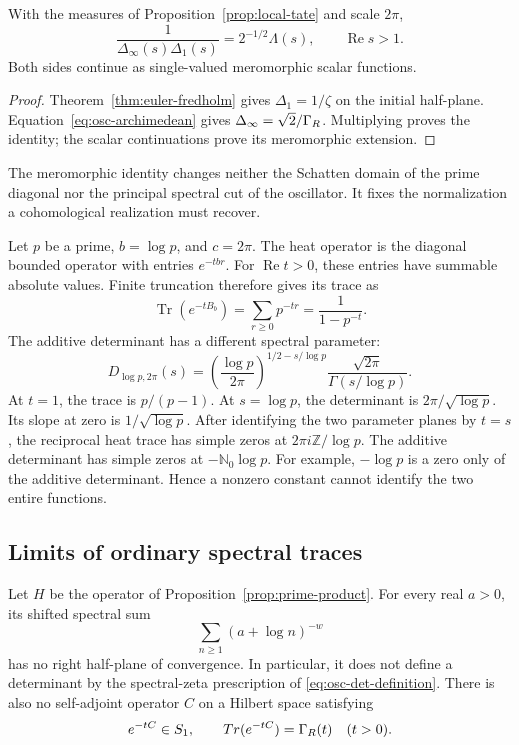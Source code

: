 \begin{corollary}
\label{cor:completed-euler}
With the measures of Proposition~\ref{prop:local-tate} and scale $2\pi$,
\[
 \frac1{\Delta_\infty(s)\Delta_1(s)}
 =2^{-1/2}\Lambda(s),\qquad \operatorname{Re}s>1.
\]
Both sides continue as single-valued meromorphic scalar functions.
\end{corollary}
\begin{proof}
Theorem~\ref{thm:euler-fredholm} gives $\Delta_1=1/\zeta$ on the
initial half-plane. Equation~\eqref{eq:osc-archimedean} gives
$\Delta_\infty=\sqrt2/\Gamma_{R}$. Multiplying proves the identity;
the scalar continuations prove its meromorphic extension.
\end{proof}
The meromorphic identity changes neither the Schatten domain of the
prime diagonal nor the principal spectral cut of the oscillator.
It fixes the normalization a cohomological realization must recover.

\begin{example}
Let \(p\) be a prime, \(b=\log p\), and \(c=2\pi\).
The heat operator is the diagonal bounded operator with entries
\(e^{-tbr}\). For \(\operatorname{Re}t>0\), these entries have summable
absolute values. Finite truncation therefore gives its trace as
\[
 \operatorname{Tr}(e^{-tB_b})=\sum_{r\geq0}p^{-tr}
 =\frac1{1-p^{-t}}.
\]
The additive determinant has a different spectral parameter:
\[
 D_{\log p,2\pi}(s)
 =\left(\frac{\log p}{2\pi}\right)^{1/2-s/\log p}
       \frac{\sqrt{2\pi}}{\Gamma(s/\log p)}.
\]
At \(t=1\), the trace is \(p/(p-1)\).
At \(s=\log p\), the determinant is \(2\pi/\sqrt{\log p}\).
Its slope at zero is \(1/\sqrt{\log p}\).
After identifying the two parameter planes by \(t=s\), the reciprocal
heat trace has simple zeros at \(2\pi i\mathbb Z/\log p\).
The additive determinant has simple zeros at \(-\mathbb N_0\log p\).
For example, \(-\log p\) is a zero only of the additive determinant.
Hence a nonzero constant cannot identify the two entire functions.
\end{example}


\subsection{Limits of ordinary spectral traces}

\begin{proposition}
\label{prop:spectral-obstructions}
Let \(H\) be the operator of Proposition~\ref{prop:prime-product}.
For every real \(a>0\), its shifted spectral sum
\[
 \sum_{n\geq1}(a+\log n)^{-w}
\]
has no right half-plane of convergence.  In particular, it does not define
a determinant by the spectral-zeta prescription of
\eqref{eq:osc-det-definition}.
There is also no self-adjoint operator \(C\) on a Hilbert space satisfying
\[
 e^{-tC}\in S_1,\qquad
 Tr(e^{-tC})=\Gamma_{R}(t)\quad(t>0).
\]
\end{proposition}

